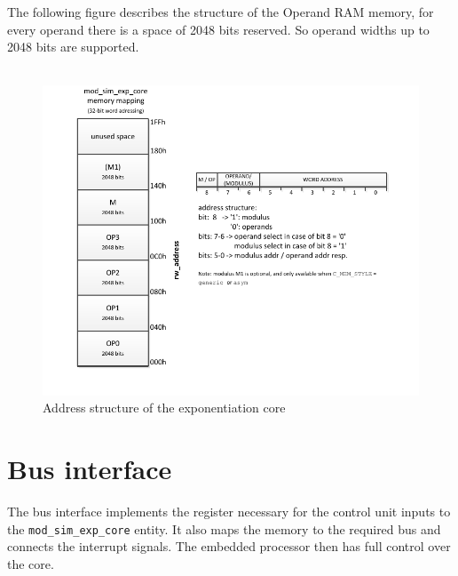 The following figure describes the structure of the Operand RAM memory, for every operand there is a space of 2048 bits 
reserved. So operand widths up to 2048 bits are supported.\\
\newline \\
\begin{figure}[H]
\centering
\includegraphics[trim=1.2cm 1.2cm 1.2cm 1.2cm, width=15cm]{pictures/msec_memory.pdf}
\caption{Address structure of the exponentiation core}
\label{Address_structure}
\end{figure}

\section{Bus interface}
The bus interface implements the register necessary for the control unit inputs to the \verb|mod_sim_exp_core| entity.
It also maps the memory to the required bus and connects the interrupt signals. The embedded processor then has full control
over the core.